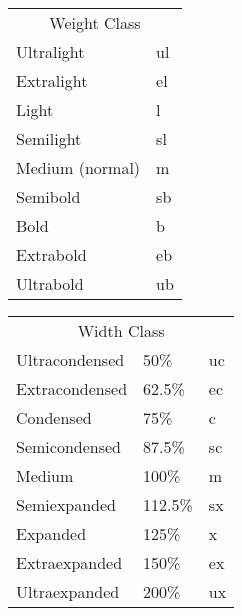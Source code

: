  \begin{table*}
   \begin{center}
     \begin{tabular}{ll}
       \multicolumn{2}{c}{Weight Class} \\[2pt]
       Ultralight     &  ul \\
       Extralight     &  el \\
       Light          &  l  \\
       Semilight      &  sl \\
       Medium (normal)&  m  \\
       Semibold       &  sb \\
       Bold           &  b  \\
       Extrabold      &  eb \\
       Ultrabold      &  ub \\
     \end{tabular}
     \hfil
     \begin{tabular}{lll}
       \multicolumn{3}{c}{Width Class} \\[2pt]
       Ultracondensed  &  50\%    &       uc  \\
       Extracondensed  &  62.5\%  &       ec  \\
       Condensed       &  75\%    &       c   \\
       Semicondensed   &  87.5\%  &       sc  \\
       Medium          &  100\%   &        m  \\
       Semiexpanded    &  112.5\% &       sx  \\
       Expanded        &  125\%   &        x  \\
       Extraexpanded   &  150\%   &       ex  \\
       Ultraexpanded   &  200\%   &       ux
     \end{tabular}
   \end{center}
   \caption{Weight and width classification for fonts.
            The percent values are derived from \protect\cite{IBM}.
            To combine the abbreviations in the {\tt\bslash series}
            command, weight is used first and any instance of medium
            ({\tt m}) is dropped except when weight and width are both
            medium.  In this case one single {\tt m} is used. So bold
            expanded would be {\tt bx} whereas medium expanded would
            be {\tt x}.}
   \label{tab:series}
 \end{table*}




